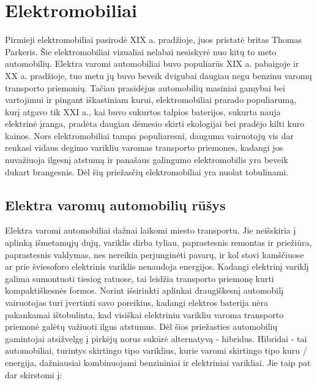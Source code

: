\documentclass[12pt, titlepage]{article}
\begin{document}
\newpage
\section{Elektromobiliai}

 Pirmieji elektromobiliai pasirodė XIX a. pradžioje, juos pristatė britas Thomas Parkeris. Šie elektromobiliai vizualiai nelabai nesiskyrė nuo kitų to meto automobilių. Elektra varomi automobiliai buvo populiarūs XIX a. pabaigoje ir XX a. pradžioje, tuo metu jų buvo beveik dvigubai daugiau negu benzinu varomų transporto priemonių. Tačiau prasidėjus automobilių masiniai gamybai bei vartojimui ir pingant iškastiniam kurui, elektromobiliai prarado populiarumą, kurį atgavo tik XXI a., kai buvo sukurtos talpios baterijos, sukurta nauja elektrinė įranga, pradėta daugiau dėmesio skirti ekologijai bei pradėjo kilti kuro kainos. Nors elektromobiliai tampa populiaresni, dauguma vairuotojų vis dar renkasi vidaus degimo varikliu varomas transporto priemones, kadangi  jos nuvažiuoja ilgesnį atstumą ir panašaus galingumo elektromobilis yra beveik dukart brangesnis. Dėl šių priežasčių elektromobiliai yra nuolat tobulinami.

\subsection{Elektra varomų automobilių rūšys}

Elektra varomi automobiliai dažnai laikomi miesto transportu. Jie neišskiria į aplinką išmetamųjų dujų, variklis dirba tyliau, paprastesnis remontas ir priežiūra, paprastesnis valdymas, nes nereikia perjunginėti pavarų, ir kol stovi kamščiuose ar prie šviesoforo elektrinis variklis nenaudoja energijos. Kadangi elektrinį variklį galima sumontuoti tiesiog ratuose, tai leidžia transporto priemonę kurti kompaktiškesnės formos. \parencite{lengvenytetransportas} Norint išsirinkti aplinkai draugiškesnį automobilį vairuotojas turi įvertinti savo poreikius, kadangi elektros baterija nėra pakankamai ištobulinta, kad visiškai elektriniu varikliu varoma transporto priemonė galėtų važiuoti ilgus atstumus. Dėl šios priežasties automobilių gamintojai atsižvelgę į pirkėjų norus sukūrė alternatyvą - hibridus. Hibridai - tai automobiliai, turintys skirtingo tipo variklius, kurie varomi skirtingo tipo kuru / energija, dažniausiai kombinuojami benzininiai ir elektriniai varikliai. Jie taip pat dar skirstomi į:
\end{document}
